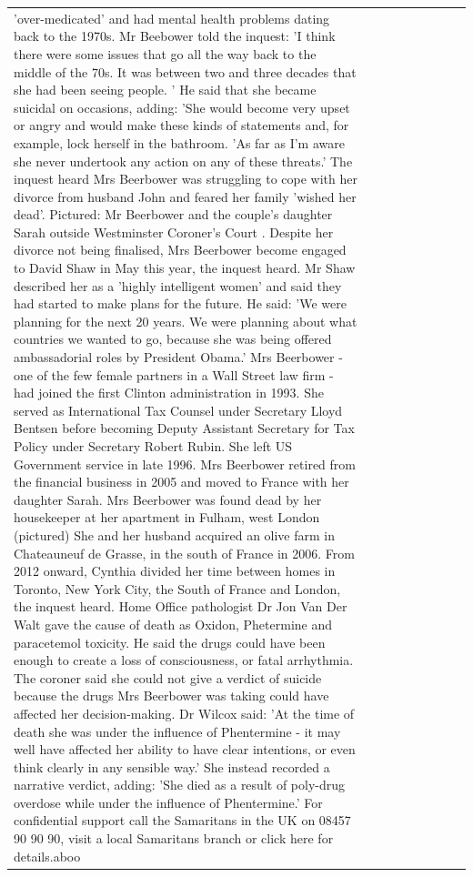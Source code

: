 \begin{table}[H]
\begin{tabular}{lllrlllll}
'over-medicated' and had mental health problems dating back to the 1970s. Mr Beebower told the inquest: 'I think there were some issues that go all the way back to the middle of the 70s. It was between two and three decades that she had been seeing people. ' He said that she became suicidal on occasions, adding: 'She would become very upset or angry and would make these kinds of statements and, for example, lock herself in the bathroom. 'As far as I'm aware she never undertook any action on any of these threats.' The inquest heard Mrs Beerbower was struggling to cope with her divorce from husband John and feared her family 'wished her dead'. Pictured: Mr Beerbower and the couple's daughter Sarah outside Westminster Coroner's Court . Despite her divorce not being finalised, Mrs Beerbower become engaged to David Shaw in May this year, the inquest heard. Mr Shaw described her as a 'highly intelligent women' and said they had started to make plans for the future. He said: 'We were planning for the next 20 years. We were planning about what countries we wanted to go, because she was being offered ambassadorial roles by President Obama.' Mrs Beerbower - one of the few female partners in a Wall Street law firm - had joined the first Clinton administration in 1993. She served as International Tax Counsel under Secretary Lloyd Bentsen before becoming Deputy Assistant Secretary for Tax Policy under Secretary Robert Rubin. She left US Government service in late 1996. Mrs Beerbower retired from the financial business in 2005 and moved to France with her daughter Sarah. Mrs Beerbower was found dead by her housekeeper at her apartment in Fulham, west London (pictured) She and her husband acquired an olive farm in Chateauneuf de Grasse, in the south of France in 2006. From 2012 onward, Cynthia divided her time between homes in Toronto, New York City, the South of France and London, the inquest heard. Home Office pathologist Dr Jon Van Der Walt gave the cause of death as Oxidon, Phetermine and paracetemol toxicity. He said the drugs could have been enough to create a loss of consciousness, or fatal arrhythmia. The coroner said she could not give a verdict of suicide because the drugs Mrs Beerbower was taking could have affected her decision-making. Dr Wilcox said: 'At the time of death she was under the influence of Phentermine - it may well have affected her ability to have clear intentions, or even think clearly in any sensible way.' She instead recorded a narrative verdict, adding: 'She died as a result of poly-drug overdose while under the influence of Phentermine.' For confidential support call the Samaritans in the UK on 08457 90 90 90, visit a local Samaritans branch or click here for details.aboo \\

\end{tabular}
\end{table}
